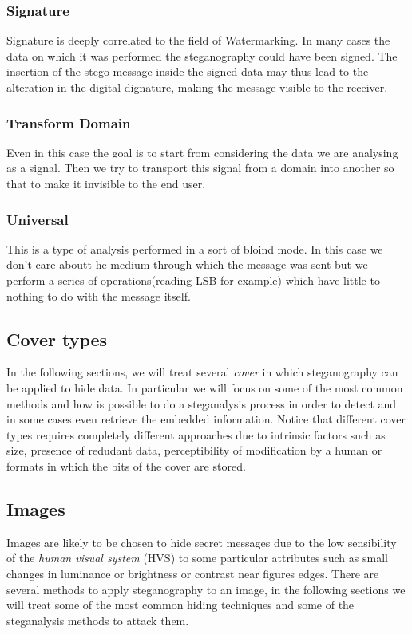 \documentclass[../../main.tex]{subfiles}
\begin{document}
    \subsubsection{Signature}
    Signature is deeply correlated to the field of Watermarking. In many cases
    the data on which it was performed the steganography could have been signed.
    The insertion of the stego message inside the signed data may thus lead to
    the alteration in the digital dignature, making the message visible to the
    receiver.
    
    \subsubsection{Transform Domain}
    Even in this case the goal is to start from considering the data we are
    analysing as a signal. Then we try to transport this signal from a domain
    into another so that to make it invisible to the end user.
    
    \subsubsection{Universal}
    This is a type of analysis performed in a sort of bloind mode. In this case
    we don't care aboutt he medium through which the message was sent but we
    perform a series of operations(reading LSB for example) which have little to
    nothing to do with the message itself.

    \subsection{Cover types}
    In the following sections, we will treat several \emph{cover} in which
    steganography can be applied to hide data.
    In particular we will focus on some of the most common methods and how is
    possible to do a steganalysis process in order to detect and in some cases
    even retrieve the embedded information.
    Notice that different cover types requires completely different approaches
    due to intrinsic factors such as size, presence of redudant data,
    perceptibility of modification by a human or formats in which the bits of
    the cover are stored.


    \subsection{Images}
    Images are likely to be chosen to hide secret messages due to the low
    sensibility of the \emph{human visual system} (HVS) to some particular
    attributes such as small changes in luminance or brightness or contrast near
    figures edges.
    There are several methods to apply steganography to an image, in the
    following sections we will treat some of the most common hiding techniques
    and some of the steganalysis methods to attack them.
\end{document}
